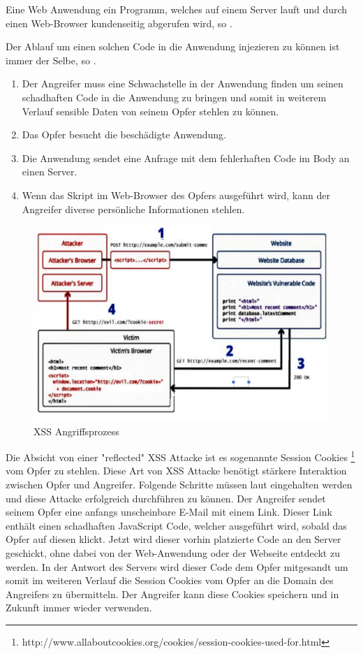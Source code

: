 Eine Web Anwendung ein Programm, welches auf einem Server lauft und durch einen Web-Browser kundenseitig abgerufen wird, so \textcite[1]{mahmoud2017}.

Der Ablauf um einen solchen Code in die Anwendung injezieren zu können ist immer der Selbe, so \textcite{mahmoud2017}.
\begin{enumerate}
	\item Der Angreifer muss eine Schwachstelle in der Anwendung finden um seinen schadhaften Code in die Anwendung zu bringen und somit in weiterem Verlauf sensible Daten von seinem Opfer stehlen zu können.
	\item Das Opfer besucht die beschädigte Anwendung.
	\item Die Anwendung sendet eine Anfrage mit dem fehlerhaften Code im Body an einen Server.
	\item Wenn das Skript im Web-Browser des Opfers ausgeführt wird, kann der Angreifer diverse persönliche Informationen stehlen.
\end{enumerate}

\begin{figure}[ht]
	\centering
	\includegraphics[width=0.75\linewidth]{images/XSS-attack-process.png}
	\caption{XSS Angriffsprozess\autocite[p]{mahmoud2017}}
\end{figure}


Die Absicht von einer "reflected" XSS Attacke ist es sogenannte Session Cookies \footnote[]{http://www.allaboutcookies.org/cookies/session-cookies-used-for.html} vom Opfer zu stehlen. Diese Art von XSS Attacke benötigt stärkere Interaktion zwischen Opfer und Angreifer. Folgende Schritte müssen laut \textcite[2]{mahmoud2017} eingehalten werden und diese Attacke erfolgreich durchführen zu können.
Der Angreifer sendet seinem Opfer eine anfangs unscheinbare E-Mail mit einem Link. Dieser Link enthält einen schadhaften JavaScript Code, welcher ausgeführt wird, sobald das Opfer auf diesen klickt. Jetzt wird dieser vorhin platzierte Code an den Server geschickt, ohne dabei von der Web-Anwendung oder der Webseite entdeckt zu werden. In der Antwort des Servers wird dieser Code dem Opfer mitgesandt um somit im weiteren Verlauf die Session Cookies vom Opfer an die Domain des Angreifers zu übermitteln. Der Angreifer kann diese Cookies speichern und in Zukunft immer wieder verwenden.\autocite[2]{mahmoud2017}


